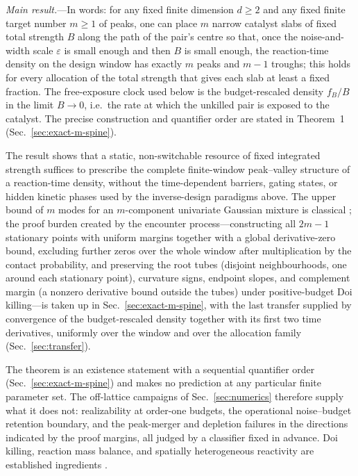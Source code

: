 \documentclass[aps,physrev,reprint,amsmath,amssymb,longbibliography,floatfix]{revtex4-2}
\begin{document}
\noindent\textit{Main result.}---In words: for any fixed finite dimension \(d\ge2\) and any fixed finite
target number \(m\ge1\) of peaks, one can place \(m\) narrow catalyst slabs of
fixed total strength \(B\) along the path of the pair's centre so that, once
the noise-and-width scale \(\varepsilon\) is small enough and then \(B\) is
small enough, the reaction-time density on the design window has exactly
\(m\) peaks and \(m-1\) troughs; this holds for every allocation of the
total strength that gives each slab at least a fixed fraction.  The
free-exposure clock used below is the budget-rescaled density \(f_B/B\) in
the limit \(B\to0\), i.e.\ the rate at which the unkilled pair is exposed to
the catalyst.  The precise construction and quantifier order are stated in
Theorem~1 (Sec.~\ref{sec:exact-m-spine}).

The result shows that a static, non-switchable resource of fixed integrated
strength suffices to prescribe the complete finite-window peak--valley
structure of a reaction-time density, without the time-dependent barriers,
gating states, or hidden kinetic phases used by the inverse-design paradigms
above.  The upper bound of \(m\) modes for an \(m\)-component univariate
Gaussian mixture is classical
\cite{carreiraPerpinanWilliams2003modes,amendolaEngstromHaase2020modes}; the
proof burden created by the encounter process---constructing all \(2m-1\)
stationary points with uniform margins together with a global
derivative-zero bound, excluding further zeros over the whole window after
multiplication by the contact probability, and preserving the root tubes
(disjoint neighbourhoods, one around each stationary point), curvature
signs, endpoint slopes, and complement margin (a nonzero derivative bound
outside the tubes) under positive-budget Doi killing---is taken up in
Sec.~\ref{sec:exact-m-spine}, with the last transfer supplied by convergence
of the budget-rescaled density together with its first two time
derivatives, uniformly over the window and over the allocation family
(Sec.~\ref{sec:transfer}).

The theorem is an existence statement with a sequential quantifier order
(Sec.~\ref{sec:exact-m-spine}) and makes no prediction at any particular
finite parameter set.  The off-lattice campaigns of
Sec.~\ref{sec:numerics} therefore supply what it does not:
realizability at order-one budgets, the operational noise--budget
retention boundary, and the peak-merger and depletion failures in the
directions indicated by the proof margins, all judged by a classifier fixed
in advance.  Doi killing, reaction mass
balance, and spatially heterogeneous reactivity are established ingredients
\cite{doi1976stochastic,teramotoShigesada1967,erbanChapman2009,isaacsonZhang2018,isaacsonMauroNewby2016uniform,pruestelMeierSchellersheim2014area,bressloff2022feynmanKac,grebenkov2019heterogeneous,grebenkov2020paradigm}.
\end{document}
